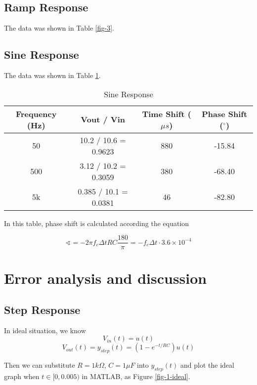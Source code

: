 \documentclass{article}
\begin{document}
\subsection{Ramp Response}
The data was shown in Table \ref{fig-3}.


\subsection{Sine Response}
The data was shown in Table \ref{tab-4}.

\begin{table}[htbp]
	\centering
	\begin{tabular}{|c|c|c|c|}
		\hline
		Frequency (Hz) & Vout / Vin & Time Shift ($\mu s$) & Phase Shift ($^\circ$) \\
		\hline
		50 & 10.2 / 10.6 = 0.9623 & 880 & -15.84 \\
		\hline
		500 & 3.12 / 10.2  = 0.3059 & 380 & -68.40 \\
		\hline
		5k & 0.385 / 10.1 = 0.0381 & 46 & -82.80\\
		\hline
	\end{tabular}
	\caption{Sine Response}
	\label{tab-4}
\end{table}

In this table, phase shift is calculated according the equation

$$\sphericalangle=-2\pi f_c\Delta t RC \frac{180}{\pi}=-f_c\Delta t\cdot 3.6\times10^{-4}$$

\newpage

\section{Error analysis and discussion}
\subsection{Step Response}
In ideal situation, we know
$$V_{in}(t)=u(t)$$
$$V_{out}(t)=y_{step}(t)=(1-e^{-t/RC})u(t)$$

Then we can substitute $R=1k\Omega$, $C=1\mu F$ into $y_{step}(t)$ and plot the ideal graph when $t\in[0,0.005)$ in MATLAB, as Figure \ref{fig-1-ideal}.

\end{document}
